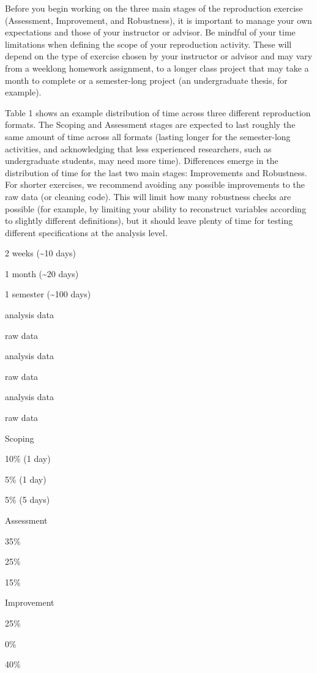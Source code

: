 \documentclass[]{book}
\begin{document}
Before you begin working on the three main stages of the reproduction exercise (Assessment, Improvement, and Robustness), it is important to manage your own expectations and those of your instructor or advisor. Be mindful of your time limitations when defining the scope of your reproduction activity. These will depend on the type of exercise chosen by your instructor or advisor and may vary from a weeklong homework assignment, to a longer class project that may take a month to complete or a semester-long project (an undergraduate thesis, for example).

Table 1 shows an example distribution of time across three different reproduction formats. The Scoping and Assessment stages are expected to last roughly the same amount of time across all formats (lasting longer for the semester-long activities, and acknowledging that less experienced researchers, such as undergraduate students, may need more time). Differences emerge in the distribution of time for the last two main stages: Improvements and Robustness. For shorter exercises, we recommend avoiding any possible improvements to the raw data (or cleaning code). This will limit how many robustness checks are possible (for example, by limiting your ability to reconstruct variables according to slightly different definitions), but it should leave plenty of time for testing different specifications at the analysis level.

2 weeks (\textasciitilde{}10 days)

1 month (\textasciitilde{}20 days)

1 semester (\textasciitilde{}100 days)

analysis data

raw data

analysis data

raw data

analysis data

raw data

Scoping

10\% (1 day)

5\% (1 day)

5\% (5 days)

Assessment

35\%

25\%

15\%

Improvement

25\%

0\%

40\%
\end{document}
